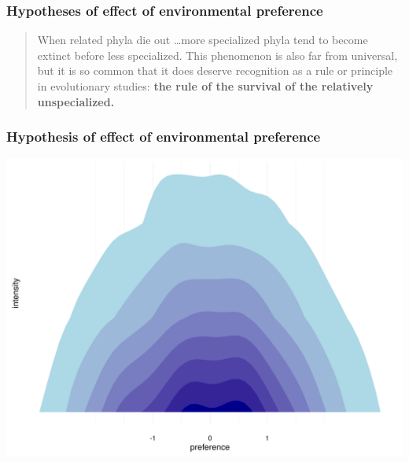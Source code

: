\documentclass{beamer}
\begin{document}
\begin{frame}
  \frametitle{Hypotheses of effect of environmental preference}
  \begin{quote}
    When related phyla die out \dots more specialized phyla tend to become extinct before less specialized. This phenomenon is also far from universal, but it is so common that it does deserve recognition as a rule or principle in evolutionary studies: \textbf{the rule of the survival of the relatively unspecialized.}

  \end{quote}
\end{frame}

\begin{frame}
  \frametitle{Hypothesis of effect of environmental preference}
  \begin{center}
    \includegraphics[width = \textwidth,height = 0.8\textheight,keepaspectratio = true]{figure/env_hypo}
  \end{center}
\end{frame}
\end{document}

